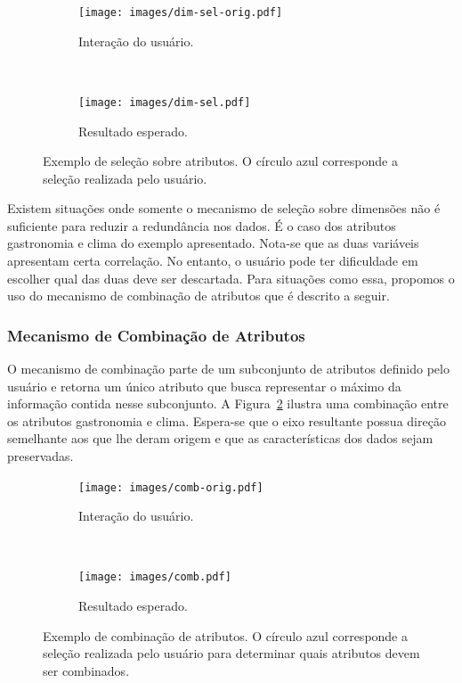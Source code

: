 \begin{figure}[h!]
  \centering
  \begin{subfigure}[b]{0.45\textwidth}
    \centering
    \texttt{[image: images/dim-sel-orig.pdf]}
    \caption{Interação do usuário.}
  \end{subfigure}%
  ~
  \begin{subfigure}[b]{0.45\textwidth}
    \centering
    \texttt{[image: images/dim-sel.pdf]}
    \caption{Resultado esperado.}
  \end{subfigure} 
  \caption[Exemplo de seleção sobre atributos.]
  {Exemplo de seleção sobre atributos. O círculo azul
  corresponde a seleção realizada pelo usuário.}
  \label{fig:item-sel}
\end{figure}

Existem situações onde somente o mecanismo de seleção sobre
dimensões não é suficiente para reduzir a redundância nos
dados. É o caso dos atributos gastronomia e clima do exemplo
apresentado. Nota-se que as duas variáveis apresentam certa
correlação. No entanto, o usuário pode ter dificuldade em
escolher qual das duas deve ser descartada. Para situações
como essa, propomos o uso do mecanismo de combinação de
atributos que é descrito a seguir.

\subsubsection{Mecanismo de Combinação de Atributos}

O mecanismo de combinação parte de um subconjunto de atributos
definido pelo usuário e retorna um único atributo que busca
representar o máximo da informação contida nesse subconjunto. A
Figura~\ref{fig:comb} ilustra uma combinação entre os atributos
gastronomia e clima. Espera-se que o eixo resultante possua 
direção semelhante aos que lhe deram origem e que as
características dos dados sejam preservadas.

\begin{figure}[h!]
  \centering
  \begin{subfigure}[b]{0.45\textwidth}
    \centering
    \texttt{[image: images/comb-orig.pdf]}
    \caption{Interação do usuário.}
  \end{subfigure}%
  ~
  \begin{subfigure}[b]{0.45\textwidth}
    \centering
    \texttt{[image: images/comb.pdf]}
    \caption{Resultado esperado.}
  \end{subfigure} 
  \caption[Exemplo de combinação de atributos.]
  {Exemplo de combinação de atributos. O círculo azul
  corresponde a seleção realizada pelo usuário para
  determinar quais atributos devem ser combinados.}
  \label{fig:comb}
\end{figure}


